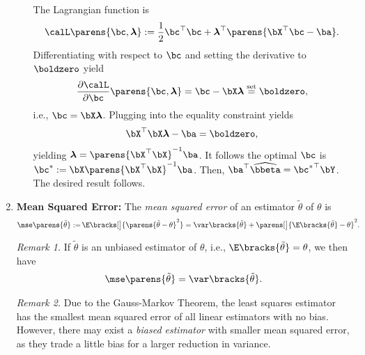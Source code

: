 \documentclass[12pt]{article}
\begin{document}
\begin{enumerate}[label=\textbf{\arabic*.}]
\begin{enumerate}
		The Lagrangian function is 
		\begin{align*}
			\calL \parens{\bc, \boldsymbol{\lambda}} := \frac{1}{2} \bc^\top \bc + \boldsymbol{\lambda}^\top \parens{\bX^\top \bc - \ba}. 
		\end{align*}
		Differentiating with respect to $\bc$ and setting the derivative to $\boldzero$ yield 
		\begin{align*}
			\frac{\partial \calL}{\partial \bc} \parens{\bc, \boldsymbol{\lambda}} = \bc - \bX \boldsymbol{\lambda} \stackrel{\text{set}}{=} \boldzero, 
		\end{align*}
		i.e., $\bc = \bX \boldsymbol{\lambda}$. Plugging into the equality constraint yields 
		\begin{align*}
			\bX^\top \bX \boldsymbol{\lambda} - \ba = \boldzero, 
		\end{align*}
		yielding $\boldsymbol{\lambda} = \parens{\bX^\top \bX}^{-1} \ba$. It follows the optimal $\bc$ is $\bc^* := \bX \parens{\bX^\top \bX}^{-1} \ba$. Then, $\ba^\top \widehat{\bbeta} = {\bc^*}^\top \bY$. The desired result follows. 
		
	\end{enumerate}
	
	\item \textbf{Mean Squared Error:} The \textit{mean squared error} of an estimator $\tilde{\theta}$ of $\theta$ is 
	\begin{align*}
		\mse \parens{\tilde{\theta}} := & \, \E \bracks[\big]{\parens{\tilde{\theta} - \theta}^2} 
		= \var \bracks{\tilde{\theta}} + \parens[\big]{\E \bracks{\tilde{\theta}} - \theta}^2. 
	\end{align*}
	
	\textit{Remark 1.} If $\tilde{\theta}$ is an unbiased estimator of $\theta$, i.e., $\E \bracks{\tilde{\theta}} = \theta$, we then have 
	\begin{align*}
		\mse \parens{\tilde{\theta}} = \var \bracks{\tilde{\theta}}. 
	\end{align*}
	
	\textit{Remark 2.} Due to the Gauss-Markov Theorem, the least squares estimator has the smallest mean squared error of all linear estimators with no bias. However, there may exist a \emph{biased estimator} with smaller mean squared error, as they trade a little bias for a larger reduction in variance. 
	

\end{enumerate}
\end{document}
